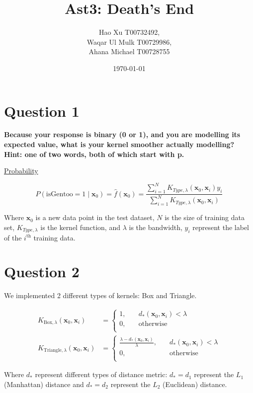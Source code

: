 \documentclass[12pt]{article}
\title{Ast3: Death's End}
\author{
Hao Xu T00732492,\\
Waqar Ul Mulk T00729986,\\
Ahana Michael T00728755}
\date{\today}
\begin{document}
	
\maketitle

\section{Question 1}

\textbf{Because your response is binary (0 or 1), and you are modelling its expected value, what is your kernel smoother actually modelling? Hint: one of two words, both of which start with p.}

\underline{Probability}

\[
P(\text{isGentoo}=1 \mid \mathbf{x}_0) = \hat{f}(\mathbf{x}_0) = \frac{\sum_{i=1}^{N} K_{Type, \lambda}\left( \mathbf{x}_0, \mathbf{x}_i \right) y_i}{\sum_{i=1}^{N} K_{Type,\lambda}\left( \mathbf{x}_0, \mathbf{x}_i \right)}
\] 

Where $\mathbf{x}_0$ is a new data point in the test dataset, $N$ is the size of training data set, $K_{Type, \lambda}$ is the kernel function, and $\lambda$ is the bandwidth, $y_i$ represent the label of the $i^{\text{th}}$ training data.

\section{Question 2}

We implemented 2 different types of kernels: Box and Triangle. 

\begin{align*}
K_{\text{Box}, \lambda}(\mathbf{x}_0, \mathbf{x}_i) &= 
\begin{cases}
1, &\quad d_{*}(\mathbf{x}_0, \mathbf{x}_i)<\lambda\\
0, &\quad \text{otherwise}\\
\end{cases}\\
K_{\text{Triangle}, \lambda}(\mathbf{x}_0, \mathbf{x}_i) &= 
\begin{cases}
\frac{\lambda - d_{*}(\mathbf{x}_0, \mathbf{x}_i)}{\lambda}, &\quad d_{*}(\mathbf{x}_0, \mathbf{x}_i)<\lambda\\
0, &\quad \text{otherwise}\\
\end{cases}
\end{align*}

Where $d_{*}$ represent different types of distance metric: $d_{*} = d_{1}$ represent the $L_1$ (Manhattan) distance and $d_{*} = d_{2}$ represent the $L_2$ (Euclidean) distance.
\end{document}
